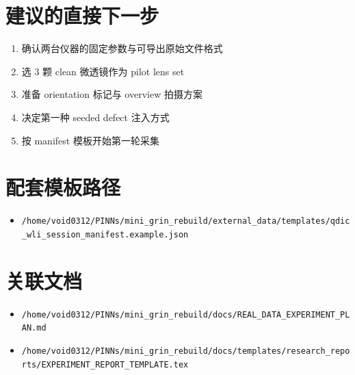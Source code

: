 \documentclass[UTF8,a4paper,11pt]{ctexart}
\newcommand{\Code}[1]{\texttt{#1}}
\begin{document}
\section{建议的直接下一步}

\begin{enumerate}
  \item 确认两台仪器的固定参数与可导出原始文件格式
  \item 选 3 颗 clean 微透镜作为 pilot lens set
  \item 准备 orientation 标记与 overview 拍摄方案
  \item 决定第一种 seeded defect 注入方式
  \item 按 manifest 模板开始第一轮采集
\end{enumerate}

\appendix

\section{配套模板路径}

\begin{itemize}
  \item \Code{/home/void0312/PINNs/mini\_grin\_rebuild/external\_data/templates/qdic\_wli\_session\_manifest.example.json}
\end{itemize}

\section{关联文档}

\begin{itemize}
  \item \Code{/home/void0312/PINNs/mini\_grin\_rebuild/docs/REAL\_DATA\_EXPERIMENT\_PLAN.md}
  \item \Code{/home/void0312/PINNs/mini\_grin\_rebuild/docs/templates/research\_reports/EXPERIMENT\_REPORT\_TEMPLATE.tex}
\end{itemize}
\end{document}
